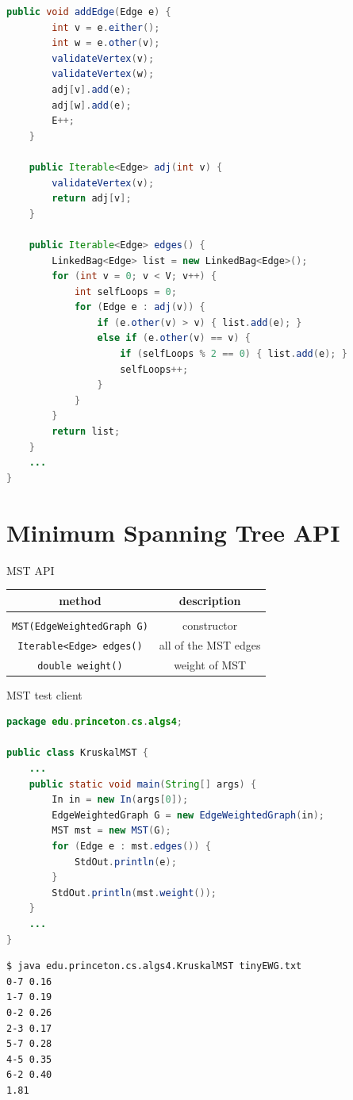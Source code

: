 \documentclass[8pt,a4paper,compress]{beamer}
\begin{document}
\begin{frame}[fragile]
\begin{lstlisting}[language=Java]
    public void addEdge(Edge e) {
        int v = e.either();
        int w = e.other(v);
        validateVertex(v);
        validateVertex(w);
        adj[v].add(e);
        adj[w].add(e);
        E++;
    }

    public Iterable<Edge> adj(int v) {
        validateVertex(v);
        return adj[v];
    }

    public Iterable<Edge> edges() {
        LinkedBag<Edge> list = new LinkedBag<Edge>();
        for (int v = 0; v < V; v++) {
            int selfLoops = 0;
            for (Edge e : adj(v)) {
                if (e.other(v) > v) { list.add(e); }
                else if (e.other(v) == v) {
                    if (selfLoops % 2 == 0) { list.add(e); }
                    selfLoops++;
                }
            }
        }
        return list;
    }
    ...
}
\end{lstlisting}
\end{frame}

\section{Minimum Spanning Tree API}
\begin{frame}[fragile]
MST API
\begin{center}
\begin{tabular}{cc}
method & description \\ \hline \\
\lstinline$MST(EdgeWeightedGraph G)$ & constructor \\
\lstinline$Iterable<Edge> edges()$ & all of the MST edges \\
\lstinline$double weight()$ & weight of MST
\end{tabular}  
\end{center}

MST test client
\begin{lstlisting}[language=Java]
package edu.princeton.cs.algs4;

public class KruskalMST {
    ...
    public static void main(String[] args) {
        In in = new In(args[0]);
        EdgeWeightedGraph G = new EdgeWeightedGraph(in);
        MST mst = new MST(G);
        for (Edge e : mst.edges()) { 
            StdOut.println(e);
        }
        StdOut.println(mst.weight());
    }
    ...
}
\end{lstlisting}

\begin{lstlisting}[language={}]
$ java edu.princeton.cs.algs4.KruskalMST tinyEWG.txt
0-7 0.16
1-7 0.19
0-2 0.26
2-3 0.17
5-7 0.28
4-5 0.35
6-2 0.40
1.81
\end{lstlisting}
\end{frame}
\end{document}
